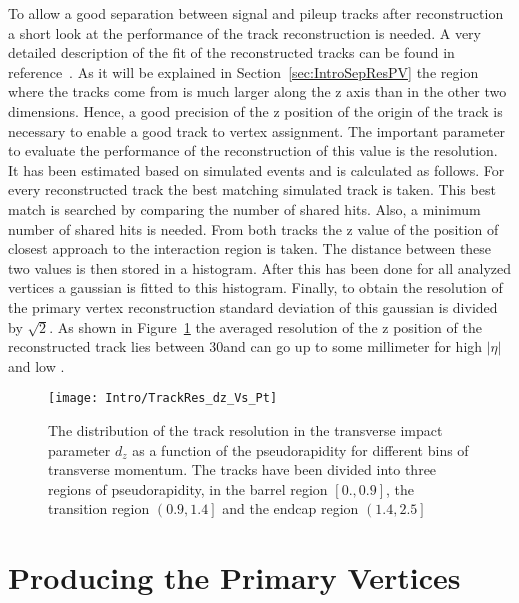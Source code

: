 To allow a good separation between signal and pileup tracks after reconstruction a short look at the performance of the track reconstruction is needed. A very detailed description of the fit of the reconstructed tracks can be found in reference~. As it will be explained in Section~\ref{sec:IntroSepResPV} the region where the tracks come from is much larger along the z axis than in the other two dimensions. Hence, a good precision of the z position of the origin of the track is necessary to enable a good track to vertex assignment. The important parameter to evaluate the performance of the reconstruction of this value is the resolution. It has been estimated based on simulated events and is calculated as follows. For every reconstructed track the best matching simulated track is taken. This best match is searched by comparing the number of shared hits. Also, a minimum number of shared hits is needed. From both tracks the z value of the position of closest approach to the interaction region is taken. The distance between these two values is then stored in a histogram. After this has been done for all analyzed vertices a gaussian is fitted to this histogram. Finally, to obtain the resolution of the primary vertex reconstruction standard deviation of this gaussian is divided by $\sqrt{2}$.  As shown in Figure~\ref{plot:IntroTrackRes} the averaged resolution of the z position of the reconstructed track lies between 30\mum and can go up to some millimeter for high $\left|\eta\right|$ and low \pt. 

\begin{figure}[!Hhtb]
  \centering
  \texttt{[image: Intro/TrackRes\_dz\_Vs\_Pt]}
  \caption[Track resolution \vs pseudo rapidity for different bins of transverse momentum]{The distribution of the track resolution in the transverse impact parameter $d_{z}$ as a function of the pseudorapidity for different bins of transverse momentum. The tracks have been divided into three regions of pseudorapidity, in the barrel region $\left[0., 0.9\right]$, the transition region $\left(0.9, 1.4\right]$ and the endcap region $\left(1.4, 2.5\right]$\label{plot:IntroTrackRes}}
\end{figure}

\section{Producing the Primary Vertices\label{sec:IntroProdPV}}

